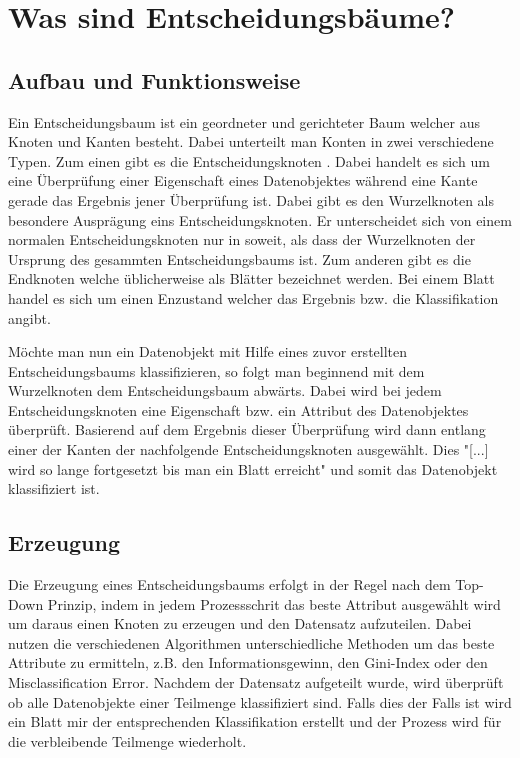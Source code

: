 \chapter{Was sind Entscheidungsbäume?}
\label{eb:was-sind-entscheidungsbaeume}

\section{Aufbau und Funktionsweise}
\label{eb:aufbau}
Ein Entscheidungsbaum ist ein geordneter und gerichteter \autocite{DataMining} Baum welcher aus Knoten und Kanten besteht. Dabei unterteilt man Konten in zwei verschiedene Typen. Zum einen gibt es die Entscheidungsknoten \autocite{FramworkForSensitivity:online}. Dabei handelt es sich um eine Überprüfung einer Eigenschaft eines Datenobjektes \autocite{DataMining} während eine Kante gerade das Ergebnis jener Überprüfung ist. Dabei gibt es den Wurzelknoten als besondere Ausprägung eins Entscheidungsknoten. Er unterscheidet sich von einem normalen Entscheidungsknoten nur in soweit, als dass der Wurzelknoten der Ursprung des gesammten Entscheidungsbaums ist. Zum anderen gibt es die Endknoten \autocite{FramworkForSensitivity:online} welche üblicherweise als Blätter bezeichnet werden. Bei einem Blatt handel es sich um einen Enzustand welcher das Ergebnis bzw. die Klassifikation angibt. \autocite{DataMining}

Möchte man nun ein Datenobjekt mit Hilfe eines zuvor erstellten Entscheidungsbaums klassifizieren, so folgt man beginnend mit dem Wurzelknoten dem Entscheidungsbaum abwärts. Dabei wird bei jedem Entscheidungsknoten eine Eigenschaft bzw. ein Attribut des Datenobjektes überprüft. Basierend auf dem Ergebnis dieser Überprüfung wird dann entlang einer der Kanten der nachfolgende Entscheidungsknoten ausgewählt. \autocite{DataMining} Dies "[...] wird so lange fortgesetzt bis man ein Blatt erreicht" \autocite{Entschei47:online} und somit das Datenobjekt klassifiziert ist.

\section{Erzeugung}
\label{eb:erstellung}
Die Erzeugung eines Entscheidungsbaums erfolgt in der Regel nach dem Top-Down Prinzip, indem in jedem Prozessschrit das beste Attribut ausgewählt wird um daraus einen Knoten zu erzeugen und den Datensatz aufzuteilen. \autocite{TopDownInduction} Dabei nutzen die verschiedenen Algorithmen unterschiedliche Methoden um das beste Attribute zu ermitteln, z.B. den Informationsgewinn, den Gini-Index oder den Misclassification Error. \autocite{DataMining} Nachdem der Datensatz aufgeteilt wurde, wird überprüft ob alle Datenobjekte einer Teilmenge klassifiziert sind. Falls dies der Falls ist wird ein Blatt mir der entsprechenden Klassifikation erstellt und der Prozess wird für die verbleibende Teilmenge wiederholt. \autocite{SebastianManteyPruning:online}


